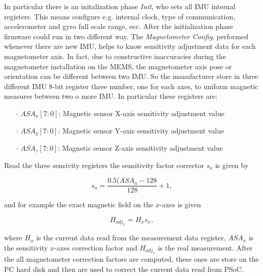 In particular there is an initalization phase \textit{Init}, who sets all IMU internal registers. This means configure e.g. internal clock, type of communication, accelerometer and gyro full scale range, ecc. 
After the initialization phase firmware could run in two different way. The \textit{Magnetometer Config}, performed whenever there are new IMU, helps to know sensitivity adjustment data for each magnetometer axis. In fact, due to constructive inaccuracies during the magnetometer installation on the MEMS, the magnetometer axis pose or orientation can be different between two IMU. So the manufacturer store in three different IMU 8-bit register three number, one for each axes, to uniform magnetic measures between two o more IMU. In particular these registers are:

\begin{enumerate}
\item[$\cdot$] $ASA_x[7:0]$: Magnetic sensor X-axis sensitivity adjustment value
\item[$\cdot$] $ASA_y[7:0]$: Magnetic sensor Y-axis sensitivity adjustment value
\item[$\cdot$] $ASA_z[7:0]$: Magnetic sensor Z-axis sensitivity adjustment value
\end{enumerate}

Read the three sensivity registers the sensitivity factor corrector $s_a$ is given by %

\begin{equation}
s_a  = \frac{ 0.5(ASA_a - 128}{128} + 1,
\end{equation} 

\noindent and for example the exact magnetic field on the $x$-axes is given

\begin{equation}
H_{{adj}_x} = H_x s_x,
\end{equation} 

\noindent where $H_x$ is the current data read from the measurement data register, $ASA_x$ is the sensitivity $x$-axes correction factor and $H_{{adj}_x}$ is the real measurement. 
After the all magnetometer correction factors are computed, these ones are store on the PC hard disk and then are used to correct the current data read from PSoC. %

